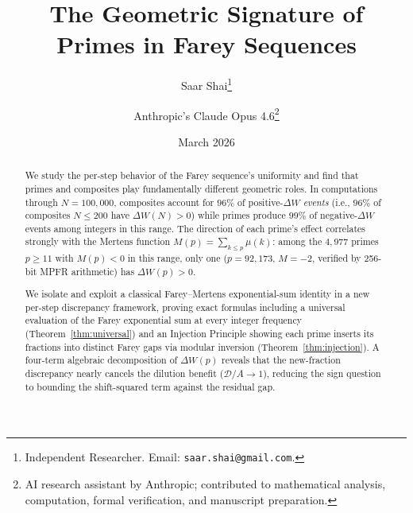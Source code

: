 \documentclass[11pt]{article}
\title{The Geometric Signature of Primes in Farey Sequences}
\author{
  Saar Shai\thanks{Independent Researcher. Email: \texttt{saar.shai@gmail.com}.}
  \and
  Anthropic's Claude Opus 4.6\thanks{AI research assistant by Anthropic; contributed to mathematical analysis, computation, formal verification, and manuscript preparation.}
}
\date{March 2026}
\theoremstyle{definition}
\begin{document}
\maketitle

\begin{abstract}
We study the per-step behavior of the Farey sequence's uniformity
and find that primes and composites play fundamentally different
geometric roles.  In computations through $N = 100{,}000$,
composites account for $96\%$ of positive-$\Delta W$ \emph{events}
(i.e., $96\%$ of composites $N \le 200$ have $\Delta W(N) > 0$)
while primes produce $99\%$ of negative-$\Delta W$ events
among integers in this range.  The direction of
each prime's effect correlates strongly with the Mertens function
$M(p) = \sum_{k \le p} \mu(k)$: among the $4{,}977$ primes
$p \ge 11$ with $M(p) < 0$ in this range, only one
($p = 92{,}173$, $M = -2$, verified by 256-bit MPFR
arithmetic) has $\Delta W(p) > 0$.

We isolate and exploit a classical Farey--Mertens exponential-sum
identity in a new per-step discrepancy framework, proving exact
formulas including a universal evaluation of the Farey exponential
sum at every integer frequency
(Theorem~\ref{thm:universal}) and an Injection Principle showing
each prime inserts its fractions into distinct Farey gaps via
modular inversion (Theorem~\ref{thm:injection}).
A four-term algebraic decomposition of $\Delta W(p)$ reveals
that the new-fraction discrepancy nearly cancels the dilution
benefit ($\mathcal{D}/A \to 1$), reducing the sign question to
bounding the shift-squared term against the residual gap.


\end{abstract}
\end{document}
